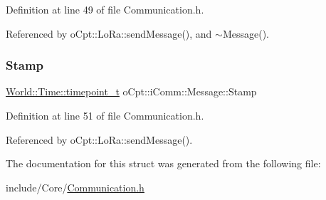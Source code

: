 Definition at line 49 of file Communication.\+h.



Referenced by o\+Cpt\+::\+Lo\+Ra\+::send\+Message(), and $\sim$\+Message().

\hypertarget{structo_cpt_1_1i_comm_1_1_message_ad00181a6c0e5cc88b61f808c1638972f}{}\label{structo_cpt_1_1i_comm_1_1_message_ad00181a6c0e5cc88b61f808c1638972f} 
\subsubsection{\texorpdfstring{Stamp}{Stamp}}
{\footnotesize\ttfamily \hyperlink{classo_cpt_1_1_world_1_1_time_a6a6e782c3c90622c1c7070b0a223ec4c}{World\+::\+Time\+::timepoint\+\_\+t} o\+Cpt\+::i\+Comm\+::\+Message\+::\+Stamp}



Definition at line 51 of file Communication.\+h.



Referenced by o\+Cpt\+::\+Lo\+Ra\+::send\+Message().



The documentation for this struct was generated from the following file\+:\begin{DoxyCompactItemize}
\item 
include/\+Core/\hyperlink{_communication_8h}{Communication.\+h}\end{DoxyCompactItemize}
